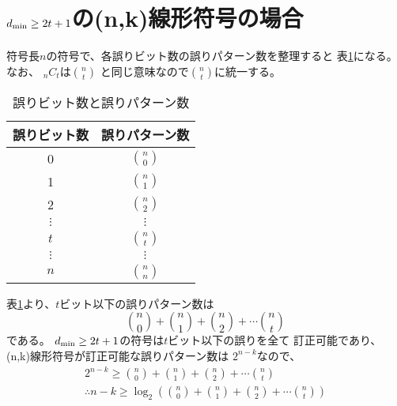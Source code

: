 \documentclass[a4paper,11pt]{jsarticle}
\begin{document}
\section{$d_{\rm min} \geq 2t+1$の(n,k)線形符号の場合}
符号長$n$の符号で、各誤りビット数の誤りパターン数を整理すると
表\ref{table:error-bits-num}になる。なお、
${}_nC_t$は$\binom{n}{t}$
と同じ意味なので$\binom{n}{t}$に統一する。
\begin{table}[hbtp]
  \caption{誤りビット数と誤りパターン数}
  \label{table:error-bits-num}
  \centering
  \begin{tabular}{|cc|}
    \hline
    誤りビット数 & 誤りパターン数 \\ \hline \hline
    0 & $\binom{n}{0}$ \\ \hline
    1 & $\binom{n}{1}$ \\ \hline 
    2 & $\binom{n}{2}$ \\ \hline 
    $\vdots$ & $\vdots$ \\ \hline
    $t$ & $\binom{n}{t}$ \\ \hline
    $\vdots$ & $\vdots$ \\ \hline
    $n$ & $\binom{n}{n}$ \\ \hline
  \end{tabular}
\end{table}
表\ref{table:error-bits-num}より、$t$ビット以下の誤りパターン数は
\[
  \binom{n}{0}+\binom{n}{1}+\binom{n}{2}+\cdots \binom{n}{t}
\]
である。
$d_{\rm min} \geq 2t+1$の符号は$t$ビット以下の誤りを全て
訂正可能であり、(n,k)線形符号が訂正可能な誤りパターン数は
$2^{n-k}$なので、
\begin{eqnarray*}
  2^{n-k} \geq \binom{n}{0}+\binom{n}{1}+\binom{n}{2}+\cdots \binom{n}{t} \\
  \therefore n-k \geq \log_2\left(\binom{n}{0}+\binom{n}{1}+\binom{n}{2}+\cdots \binom{n}{t}\right)
\end{eqnarray*}
\end{document}
